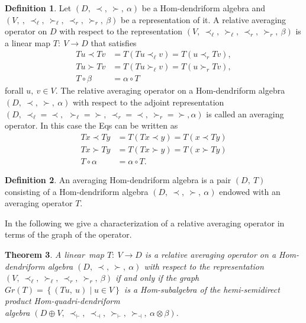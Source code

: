 \documentclass[11pt,twoside,reqno]{amsart}
\theoremstyle{plain}
\newtheorem{thm}{Theorem}[section]
\theoremstyle{definition}
\newtheorem{definition}[thm]{Definition}
\begin{document}
\begin{definition}\label{d10}
Let $(D ,\ \prec,\  \succ,\  \alpha)$ be a Hom-dendriform algebra and $(V,\   ,\ \prec_{\ell} ,\ \succ_{\ell} ,\  \prec_{r} ,\ \succ_{r}  ,\ \beta)$ be a representation of it. A relative averaging operator on $D$ with respect to the representation 
$(V,\   \prec_{\ell} ,\ \succ_{\ell} ,\ \prec_{r} ,\ \succ_{r},\ \beta)$ is a linear map $T :\ V \to D$ that satisfies
\begin{align*}
Tu \prec Tv& = T(Tu \prec_{\ell} v) = T(u \prec_{r} Tv), \\
Tu \succ Tv &= T(Tu \succ_{\ell} v) = T(u \succ_{r} Tv), \\
T \circ \beta &= \alpha \circ T 
\end{align*}
forall $u ,\ v \in V$. The relative averaging operator on a Hom-dendriform algebra  $(D ,\ \prec,\  \succ ,\ \alpha)$  with respect to the
 adjoint representation $(D  ,\ \prec_{\ell}=\prec ,\ \ \succ_{\ell}=\succ ,\ \prec_{r}=\prec  ,\ \succ_{r}=\succ,\alpha)$  is called an averaging operator. In this case the Eqs can be written as 
\begin{align*}
Tx \prec Ty& = T(Tx \prec y) = T(x \prec Ty) \\
Tx \succ Ty&= T(Tx \succ y) = T(x \succ Ty)\\
T\circ \alpha&=\alpha\circ T.
\end{align*}
 \end{definition}
\begin{definition}\label{d11}
An averaging Hom-dendriform  algebra  is a  pair $(D ,\ T)$  consisting  of  a  Hom-dendriform  algebra $(D ,\ \prec,\  \succ ,\ \alpha)$ endowed with an averaging operator $T$.
\end{definition}
In the following  we give a characterization of a relative averaging operator in terms
of the graph of the operator.
\begin{thm}
A linear\ map  $T :\ V \to D$ is a relative averaging operator on a Hom-dendriform algebra $(D ,\ \prec,\  \succ ,\ \alpha)$ with respect to the representation 
$(V ,\ \prec_{\ell} ,\ \succ_{\ell},\  \prec_{r} ,\ \succ_{r},\  \beta)$ if and only if the graph\\
$Gr(T) = \left\{(Tu,\  u) \mid u \in V\right\}$
is a Hom-subalgebra of the hemi-semidirect product Hom-quadri-dendriform \\ algebra $(D \oplus V ,\ \prec_\vdash,\   \prec_\dashv,\   \succ_\vdash,\   \succ_\dashv,\  \alpha \otimes \beta).$
\end{thm}
\end{document}
